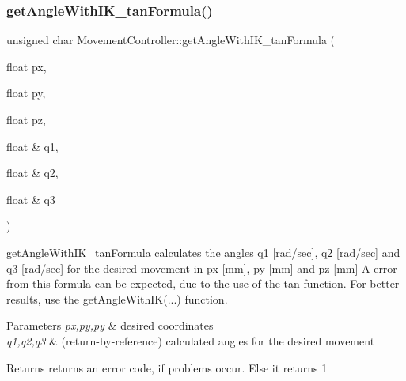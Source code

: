 \subsubsection{\texorpdfstring{get\+Angle\+With\+I\+K\+\_\+tan\+Formula()}{getAngleWithIK\_tanFormula()}}
{\footnotesize\ttfamily unsigned char Movement\+Controller\+::get\+Angle\+With\+I\+K\+\_\+tan\+Formula (\begin{DoxyParamCaption}\item[{float}]{px,  }\item[{float}]{py,  }\item[{float}]{pz,  }\item[{float \&}]{q1,  }\item[{float \&}]{q2,  }\item[{float \&}]{q3 }\end{DoxyParamCaption})}

get\+Angle\+With\+I\+K\+\_\+tan\+Formula  calculates the angles q1 \mbox{[}rad/sec\mbox{]}, q2 \mbox{[}rad/sec\mbox{]} and q3 \mbox{[}rad/sec\mbox{]} for the desired movement in px \mbox{[}mm\mbox{]}, py \mbox{[}mm\mbox{]} and pz \mbox{[}mm\mbox{]} A error from this formula can be expected, due to the use of the tan-\/function. For better results, use the \textquotesingle{}get\+Angle\+With\+IK(...)\textquotesingle{} function. 
\begin{DoxyParams}{Parameters}
{\em px,py,py} & desired coordinates \\
\hline
{\em q1,q2,q3} & (return-\/by-\/reference) calculated angles for the desired movement\\
\hline
\end{DoxyParams}
\begin{DoxyReturn}{Returns}
returns an error code, if problems occur. Else it returns 1 
\end{DoxyReturn}
\mbox{\label{class_movement_controller_a0710b423644d46f7391e4b75c5879559}} 
